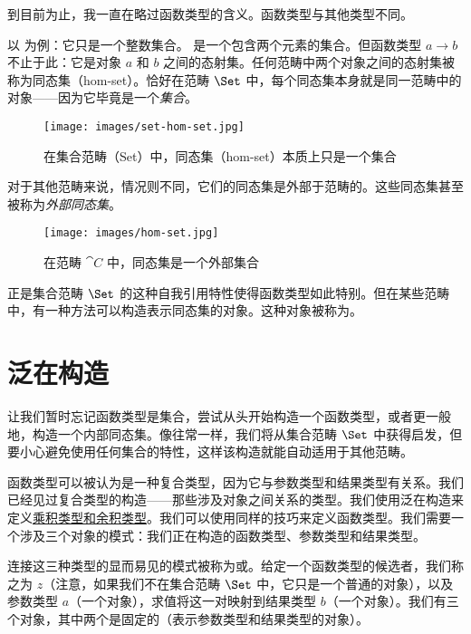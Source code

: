 
\lettrine[lhang=0.17]{到}{目前为止}，我一直在略过函数类型的含义。函数类型与其他类型不同。

以  为例：它只是一个整数集合。 是一个包含两个元素的集合。但函数类型 $a\to b$ 不止于此：它是对象 $a$ 和 $b$ 之间的态射集。任何范畴中两个对象之间的态射集被称为同态集（hom-set）。恰好在范畴 $\Set$ 中，每个同态集本身就是同一范畴中的对象——因为它毕竟是一个\emph{集合}。

\begin{figure}[H]
  \centering
  \texttt{[image: images/set-hom-set.jpg]}
  \caption{在集合范畴（Set）中，同态集（hom-set）本质上只是一个集合}
\end{figure}

\noindent
对于其他范畴来说，情况则不同，它们的同态集是外部于范畴的。这些同态集甚至被称为\emph{外部同态集}。

\begin{figure}[H]
  \centering
  \texttt{[image: images/hom-set.jpg]}
  \caption{在范畴 $\cat{C}$ 中，同态集是一个外部集合}
\end{figure}

\noindent
正是集合范畴 $\Set$ 的这种自我引用特性使得函数类型如此特别。但在某些范畴中，有一种方法可以构造表示同态集的对象。这种对象被称为。

\section{泛在构造}

让我们暂时忘记函数类型是集合，尝试从头开始构造一个函数类型，或者更一般地，构造一个内部同态集。像往常一样，我们将从集合范畴 $\Set$ 中获得启发，但要小心避免使用任何集合的特性，这样该构造就能自动适用于其他范畴。

函数类型可以被认为是一种复合类型，因为它与参数类型和结果类型有关系。我们已经见过复合类型的构造——那些涉及对象之间关系的类型。我们使用泛在构造来定义\hyperref[products-and-coproducts]{乘积类型和余积类型}。我们可以使用同样的技巧来定义函数类型。我们需要一个涉及三个对象的模式：我们正在构造的函数类型、参数类型和结果类型。

连接这三种类型的显而易见的模式被称为或。给定一个函数类型的候选者，我们称之为 $z$（注意，如果我们不在集合范畴 $\Set$ 中，它只是一个普通的对象），以及参数类型 $a$（一个对象），求值将这一对映射到结果类型 $b$（一个对象）。我们有三个对象，其中两个是固定的（表示参数类型和结果类型的对象）。

